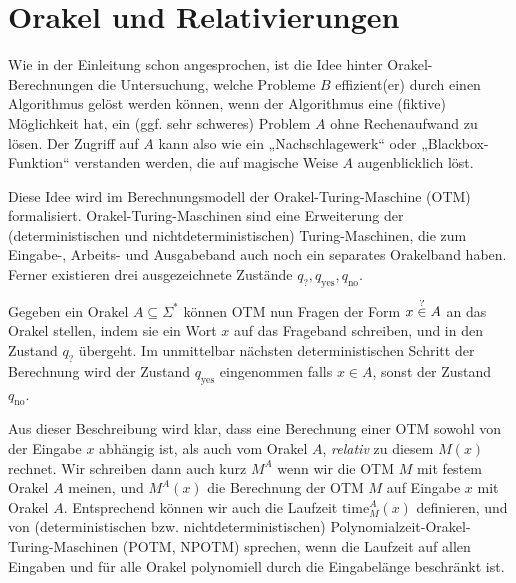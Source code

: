 \section{Orakel und Relativierungen}\label{sec:prelim-orakel}

Wie in der Einleitung schon angesprochen, ist die Idee hinter Orakel-Berechnungen die Untersuchung, welche Probleme $B$ effizient(er) durch einen Algorithmus gelöst werden können, wenn der Algorithmus eine (fiktive) Möglichkeit hat, ein (ggf. sehr schweres) Problem $A$ ohne Rechenaufwand zu lösen.
Der Zugriff auf $A$ kann also wie ein „Nachschlagewerk“ oder „Blackbox-Funktion“ verstanden werden, die auf magische Weise $A$ augenblicklich löst.

Diese Idee wird im Berechnungsmodell der Orakel-Turing-Maschine (OTM) formalisiert. Orakel-Turing-Maschinen sind eine Erweiterung der (deterministischen und nichtdeterministischen) Turing-Maschinen, die zum Eingabe-, Arbeits- und Ausgabeband auch noch ein separates Orakelband haben. Ferner existieren drei ausgezeichnete Zustände $q_?, q_\text{yes}, q_\text{no}$.

Gegeben ein Orakel $A\subseteq\Sigma^*$ können OTM nun Fragen der Form $x\stackrel{\smash ?}{\in} A$ an das Orakel stellen, indem sie ein Wort $x$ auf das Frageband schreiben, und in den Zustand $q_?$ übergeht. Im unmittelbar nächsten deterministischen Schritt der Berechnung wird der Zustand $q_\text{yes}$ eingenommen falls $x\in A$, sonst der Zustand $q_\text{no}$.

Aus dieser Beschreibung wird klar, dass eine Berechnung einer OTM sowohl von der Eingabe $x$ abhängig ist, als auch vom Orakel $A$, \emph{relativ} zu diesem $M(x)$ rechnet. Wir schreiben dann auch kurz $M^A$ wenn wir die OTM $M$ mit festem Orakel $A$ meinen, und $M^A(x)$ die Berechnung der OTM $M$ auf Eingabe $x$ mit Orakel $A$. Entsprechend können wir auch die Laufzeit $\mathrm{time}_M^A(x)$ definieren, und von (deterministischen bzw. nichtdeterministischen) Polynomialzeit-Orakel-Turing-Maschinen (POTM, NPOTM) sprechen, wenn die Laufzeit auf allen Eingaben und für alle Orakel polynomiell durch die Eingabelänge beschränkt ist.


